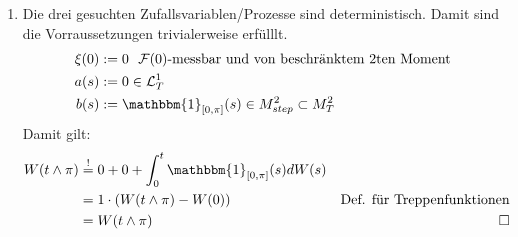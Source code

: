 \documentclass[a4paper,11pt,notitlepage,fullpage]{article}
\newcommand{\indd}[1]{\mathbbm{1}_{#1}}
\begin{document}
\begin{enumerate}
\begin{enumerate}
\item Die drei gesuchten Zufallsvariablen/Prozesse sind deterministisch. Damit sind die Vorraussetzungen trivialerweise erfülllt.
\begin{align*}
\xi(0) &:= 0 ~~\mathcal F(0)\text{-messbar und von beschränktem 2ten Moment} \\
a(s) &:= 0 \in \mathcal L_T^1 \\
b(s) &:= \indd{[0, \pi]}(s) \in M_{step}^2 \subset M_T^2
\end{align*}
Damit gilt:
\begin{align*}
W(t \wedge \pi) &\stackrel{!}{=} 0 + 0 + \int_0^t \indd{[0, \pi]}(s) dW(s) \\
&= 1 \cdot (W(t \wedge \pi) - W(0)) &\text{Def. für Treppenfunktionen} \\
&= W(t \wedge \pi) &\square
\end{align*}
\end{enumerate}

\end{enumerate}
\end{document}
